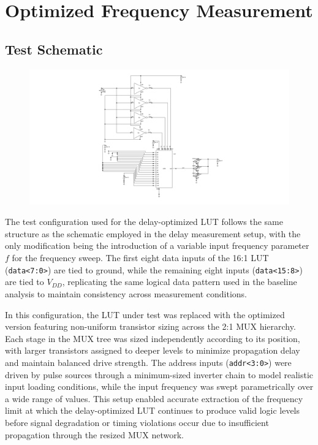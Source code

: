\documentclass[12pt]{article}
\begin{document}
\newpage

\section{Optimized Frequency Measurement}
\subsection{Test Schematic}
\begin{figure}[H]
    \centering
    \includegraphics[width=\linewidth]{writeup//figures/updated_delay_opt_testschem.png}
    \caption{}
\end{figure}
The test configuration used for the delay-optimized LUT follows the same structure as the schematic employed in the delay measurement setup, with the only modification being the introduction of a variable input frequency parameter $f$ for the frequency sweep. The first eight data inputs of the 16:1 LUT (\texttt{data<7:0>}) are tied to ground, while the remaining eight inputs (\texttt{data<15:8>}) are tied to $V_{DD}$, replicating the same logical data pattern used in the baseline analysis to maintain consistency across measurement conditions.

In this configuration, the LUT under test was replaced with the optimized version featuring non-uniform transistor sizing across the 2:1 MUX hierarchy. Each stage in the MUX tree was sized independently according to its position, with larger transistors assigned to deeper levels to minimize propagation delay and maintain balanced drive strength. The address inputs (\texttt{addr<3:0>}) were driven by pulse sources through a minimum-sized inverter chain to model realistic input loading conditions, while the input frequency was swept parametrically over a wide range of values. This setup enabled accurate extraction of the frequency limit at which the delay-optimized LUT continues to produce valid logic levels before signal degradation or timing violations occur due to insufficient propagation through the resized MUX network.
\end{document}
